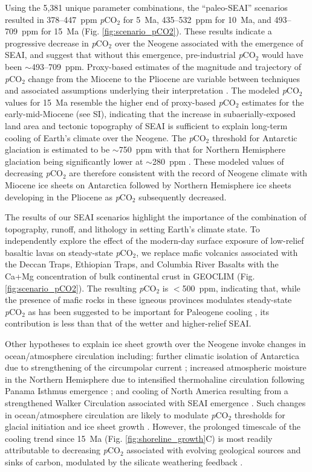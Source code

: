 \documentclass[9pt,twocolumn,twoside,lineno]{pnas-new}
\newcommand{\pCOtwo}{\textit{p}CO$_{2}$\xspace}
\begin{document}
Using the 5,381 unique parameter combinations, the ``paleo-SEAI'' scenarios resulted in 378--447~ppm \pCOtwo for 5~Ma, 435--532~ppm for 10~Ma, and 493--709~ppm for 15~Ma (Fig. \ref{fig:scenario_pCO2}). These results indicate a progressive decrease in \pCOtwo over the Neogene associated with the emergence of SEAI, and suggest that without this emergence, pre-industrial \pCOtwo would have been $\sim$493--709~ppm. Proxy-based estimates of the magnitude and trajectory of \pCOtwo change from the Miocene to the Pliocene are variable between techniques and associated assumptions underlying their interpretation \cite{Foster2017a}. The modeled \pCOtwo values for 15~Ma resemble the higher end of proxy-based \pCOtwo estimates for the early-mid-Miocene (see SI), indicating that the increase in subaerially-exposed land area and tectonic topography of SEAI is sufficient to explain long-term cooling of Earth's climate over the Neogene. The \pCOtwo threshold for Antarctic glaciation is estimated to be $\sim$750~ppm with that for Northern Hemisphere glaciation being significantly lower at $\sim$280~ppm \cite{DeConto2008a}. These modeled values of decreasing \pCOtwo are therefore consistent with the record of Neogene climate with Miocene ice sheets on Antarctica \cite{Sugden1995a} followed by Northern Hemisphere ice sheets developing in the Pliocene \cite{Haug2005a} as \pCOtwo subsequently decreased.

The results of our SEAI scenarios highlight the importance of the combination of topography, runoff, and lithology in setting Earth's climate state. To independently explore the effect of the modern-day surface exposure of low-relief basaltic lavas on steady-state \pCOtwo \cite{Kent2013a}, we replace mafic volcanics associated with the Deccan Traps, Ethiopian Traps, and Columbia River Basalts with the Ca+Mg concentration of bulk continental crust in GEOCLIM (Fig. \ref{fig:scenario_pCO2}). The resulting \pCOtwo is $<$500~ppm, indicating that, while the presence of mafic rocks in these igneous provinces modulates steady-state \pCOtwo as has been suggested to be important for Paleogene cooling \cite{Kent2013a}, its contribution is less than that of the wetter and higher-relief SEAI.

Other hypotheses to explain ice sheet growth over the Neogene invoke changes in ocean/atmosphere circulation including: further climatic isolation of Antarctica due to strengthening of the circumpolar current \cite{Shevenell2004a}; increased atmospheric moisture in the Northern Hemisphere due to intensified thermohaline circulation following Panama Isthmus emergence \cite{Haug1998a}; and cooling of North America resulting from a strengthened Walker Circulation associated with SEAI emergence \cite{Molnar2015a}. Such changes in ocean/atmosphere circulation are likely to modulate \pCOtwo thresholds for glacial initiation and ice sheet growth \cite{DeConto2008a}. However, the prolonged timescale of the cooling trend since 15~Ma (Fig. \ref{fig:shoreline_growth}C) is most readily attributable to decreasing \pCOtwo associated with evolving geological sources and sinks of carbon, modulated by the silicate weathering feedback \cite{Kump1997a}.
\end{document}
